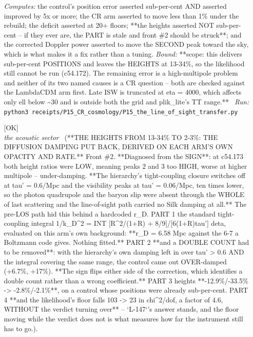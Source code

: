 \begin{description}
\emph{Computes:} the control's position error asserted sub-per-cent AND asserted improved by 5x or more; the CR arm asserted to move less than 1\% under the rebuild; the deficit asserted at 20+ floors; **the heights asserted NOT sub-per-cent -- if they ever are, the PART is stale and front \#2 should be struck**; and the corrected Doppler power asserted to move the SECOND peak toward the sky, which is what makes it a fix rather than a tuning.
 \emph{Bound:} **scope: this delivers sub-per-cent POSITIONS and leaves the HEIGHTS at 13-34\%, so the likelihood still cannot be run (c54.172). The remaining error is a high-multipole problem and neither of its two named causes is a CR question -- both are checked against the LambdaCDM arm first. Late ISW is truncated at eta = 4000, which affects only ell below \textasciitilde{}30 and is outside both the grid and plik\_lite's TT range.**
\ \emph{Run:} \texttt{python3 receipts/P15\_CR\_cosmology/P15\_the\_line\_of\_sight\_transfer.py}
\item[\rcptlabel{P15_the_derived_diffusion_damping}{P15R69}\textbf{P15R69}\quad\texttt{P15\_the\_derived\_diffusion\_damping}]\hfill\textsf{[OK]}\\
\textit{the acoustic sector} \ (**THE HEIGHTS FROM 13-34\% TO 2-3\%: THE DIFFUSION DAMPING PUT BACK, DERIVED ON EACH ARM'S OWN OPACITY AND RATE.** Front \#2. **Diagnosed from the SIGN**: at c54.173 both height ratios were LOW, meaning peaks 2 and 3 too HIGH, worse at higher multipole -- under-damping. **The hierarchy's tight-coupling closure switches off at tau' = 0.6/Mpc and the visibility peaks at tau' = 0.06/Mpc, ten times lower, so the photon quadrupole and the baryon slip were absent through the WHOLE of last scattering and the line-of-sight path carried no Silk damping at all.** The pre-LOS path hid this behind a hardcoded r\_D. PART 1 the standard tight-coupling integral 1/k\_D\textasciicircum{}2 = INT [R\textasciicircum{}2/(1+R) + 8/9]/[6(1+R)tau'] deta, evaluated on this arm's own background: **r\_D = 6.58 Mpc against the 6-7 a Boltzmann code gives. Nothing fitted.** PART 2 **and a DOUBLE COUNT had to be removed**: with the hierarchy's own damping left in over tau' > 0.6 AND the integral covering the same range, the control came out OVER-damped (+6.7\%, +17\%). **The sign flips either side of the correction, which identifies a double count rather than a wrong coefficient.** PART 3 heights **-12.9\%/-33.5\% -> -2.8\%/-2.1\%**, on a control whose positions were already sub-per-cent. PART 4 **and the likelihood's floor falls 103 -> 23 in chi\textasciicircum{}2/dof, a factor of 4.6, WITHOUT the verdict turning over** -- `L-147`'s answer stands, and the floor moving while the verdict does not is what measures how far the instrument still has to go.). 

\end{description}
